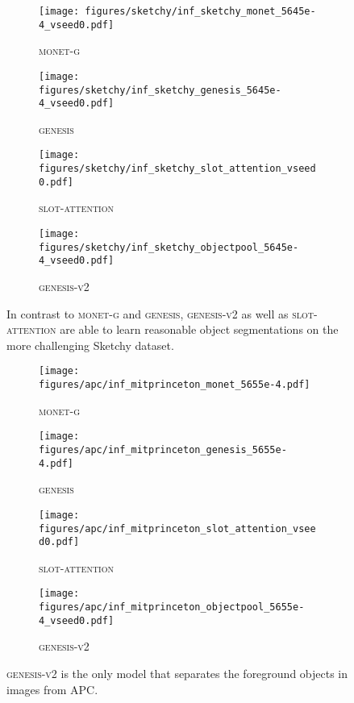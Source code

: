 \documentclass{article}
\begin{document}
\begin{figure}
	\centering
	\begin{subfigure}{0.259\linewidth}
		\texttt{[image: figures/sketchy/inf\_sketchy\_monet\_5645e-4\_vseed0.pdf]}
		\caption{\textsc{monet-g}}
	\end{subfigure}
	\begin{subfigure}{0.24\linewidth}
		\texttt{[image: figures/sketchy/inf\_sketchy\_genesis\_5645e-4\_vseed0.pdf]}
		\caption{\textsc{genesis}}
	\end{subfigure}
	\begin{subfigure}{0.24\linewidth}
		\texttt{[image: figures/sketchy/inf\_sketchy\_slot\_attention\_vseed0.pdf]}
		\caption{\textsc{slot-attention}}
	\end{subfigure}
	\begin{subfigure}{0.24\linewidth}
		\texttt{[image: figures/sketchy/inf\_sketchy\_objectpool\_5645e-4\_vseed0.pdf]}
		\caption{\textsc{genesis-v2}}
	\end{subfigure}
	\caption{In contrast to \textsc{monet-g} and \textsc{genesis}, \textsc{genesis-v2} as well as \textsc{slot-attention} are able to learn reasonable object segmentations on the more challenging Sketchy dataset.}
	\label{fig:gpp:sketchy:seg}
\end{figure}
\begin{figure}
	\centering
	\begin{subfigure}{0.259\linewidth}
		\texttt{[image: figures/apc/inf\_mitprinceton\_monet\_5655e-4.pdf]}
		\caption{\textsc{monet-g}}
	\end{subfigure}
	\begin{subfigure}{0.24\linewidth}
		\texttt{[image: figures/apc/inf\_mitprinceton\_genesis\_5655e-4.pdf]}
		\caption{\textsc{genesis}}
	\end{subfigure}
	\begin{subfigure}{0.24\linewidth}
		\texttt{[image: figures/apc/inf\_mitprinceton\_slot\_attention\_vseed0.pdf]}
		\caption{\textsc{slot-attention}}
	\end{subfigure}
	\begin{subfigure}{0.24\linewidth}
		\texttt{[image: figures/apc/inf\_mitprinceton\_objectpool\_5655e-4\_vseed0.pdf]}
		\caption{\textsc{genesis-v2}}
	\end{subfigure}
	\caption{\textsc{genesis-v2} is the only model that separates the foreground objects in images from APC.}
	\label{fig:gpp:apc:seg}
\end{figure}
\end{document}
